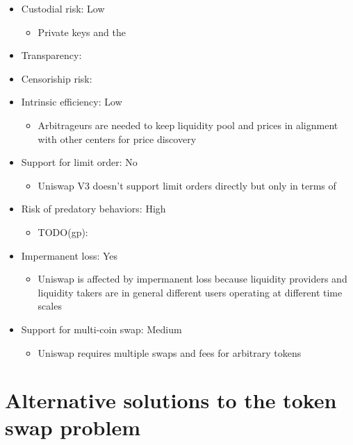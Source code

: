 \documentclass[11pt, reqno]{amsart}
\theoremstyle{definition}
\theoremstyle{remark}
\begin{document}
\begin{itemize}
	\item Custodial risk: Low
	      \begin{itemize}
		      \item Private keys and the
	      \end{itemize}
	\item Transparency:
	\item Censoriship risk:
	\item Intrinsic efficiency: Low
	      \begin{itemize}
              \item Arbitrageurs are needed to keep liquidity pool and prices
                in alignment with other centers for price discovery
	      \end{itemize}
	\item Support for limit order: No
	      \begin{itemize}
		      \item Uniswap V3 doesn't support limit orders directly but only in terms of
	      \end{itemize}
	\item Risk of predatory behaviors: High
	      \begin{itemize}
		      \item TODO(gp):
	      \end{itemize}
	\item Impermanent loss: Yes
	      \begin{itemize}
              \item Uniswap is affected by impermanent loss because liquidity
                providers and liquidity takers are in general different users
                operating at different time scales
	      \end{itemize}
	\item Support for multi-coin swap: Medium
	      \begin{itemize}
		      \item Uniswap requires multiple swaps and fees for arbitrary tokens
	      \end{itemize}
\end{itemize}


\section{Alternative solutions to the token swap problem}
\end{document}
